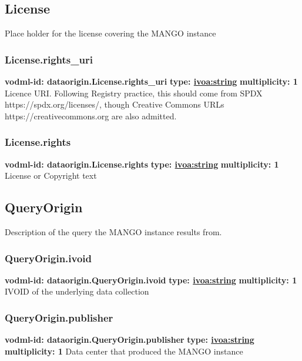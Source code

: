  \subsection{License}
    \label{sect:dataorigin.License}
    Place holder for the license covering the MANGO instance

    \subsubsection{License.rights\_uri}
    \textbf{vodml-id: dataorigin.License.rights\_uri} \newline
    \textbf{type: \hyperref[sect:ivoa]{ivoa:string}} \newline
    \textbf{multiplicity: 1} \newline
    Licence URI. Following Registry practice, this should come from SPDX https://spdx.org/licenses/, though Creative Commons URLs https://creativecommons.org are also admitted.

    \subsubsection{License.rights}
    \textbf{vodml-id: dataorigin.License.rights} \newline
    \textbf{type: \hyperref[sect:ivoa]{ivoa:string}} \newline
    \textbf{multiplicity: 1} \newline
    License or Copyright text

  \subsection{QueryOrigin}
    \label{sect:dataorigin.QueryOrigin}
    Description of the query the MANGO instance results from.

    \subsubsection{QueryOrigin.ivoid}
    \textbf{vodml-id: dataorigin.QueryOrigin.ivoid} \newline
    \textbf{type: \hyperref[sect:ivoa]{ivoa:string}} \newline
    \textbf{multiplicity: 1} \newline
    IVOID of the underlying data collection

    \subsubsection{QueryOrigin.publisher}
    \textbf{vodml-id: dataorigin.QueryOrigin.publisher} \newline
    \textbf{type: \hyperref[sect:ivoa]{ivoa:string}} \newline
    \textbf{multiplicity: 1} \newline
    Data center that produced the MANGO instance

